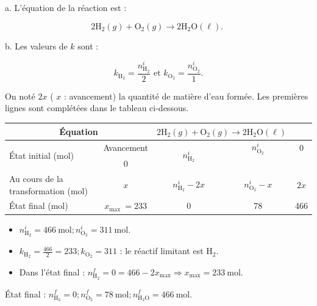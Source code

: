 a. L'équation de la réaction est :

$$
2 \mathrm{H}_{2}(g)+\mathrm{O}_{2}(g) \longrightarrow 2 \mathrm{H}_{2} \mathrm{O}(\ell) \text {. }
$$

b. Les valeurs de $k$ sont :

$$
k_{\mathrm{H}_{2}}=\frac{n_{\mathrm{H}_{2}}^{i}}{2} \text { et } k_{\mathrm{O}_{2}}=\frac{n_{\mathrm{O}_{2}}^{i}}{1} .
$$

On noté $2 x$ ( $x$ : avancement) la quantité de matière d'eau formée. Les premières lignes sont complétées dans le tableau ci-dessous.

\begin{center}
\begin{tabular}{l|c|c|c|c}
\hline
\multicolumn{2}{c|}{Équation} & \multicolumn{2}{c}{$2 \mathrm{H}_{2}(g)+\mathrm{O}_{2}(g) \longrightarrow 2 \mathrm{H}_{2} \mathrm{O}(\ell)$} &  \\
\hline
\multirow{2}{*}{État initial (mol)} & Avancement & \multirow{2}{*}{$n_{\mathrm{H}_{2}}^{i}$} & $n_{\mathrm{O}_{2}}^{i}$ & 0 \\
\cline { 2 - 2 }
 & 0 &  &  &  \\
\hline
Au cours de la transformation (mol) & $x$ & $n_{\mathrm{H}_{2}}^{i}-2 x$ & $n_{\mathrm{O}_{2}}^{i}-x$ & $2 x$ \\
\hline
État final (mol) & $x_{\text {max }}=233$ & 0 & 78 & 466 \\
\hline
\end{tabular}
\end{center}

\begin{itemize}
  \item $n_{\mathrm{H}_{2}}^{i}=466 \mathrm{~mol} ; n_{\mathrm{O}_{2}}^{i}=311 \mathrm{~mol}$.
  \item $k_{\mathrm{H}_{2}}=\frac{466}{2}=233 ; k_{\mathrm{O}_{2}}=311$ : le réactif limitant est $\mathrm{H}_{2}$.
  \item Dans l'état final : $n_{\mathrm{H}_{2}}^{f}=0=466-2 x_{\max } \Rightarrow x_{\max }=233 \mathrm{~mol}$.
\end{itemize}

État final : $n_{\mathrm{H}_{2}}^{f}=0 ; n_{\mathrm{O}_{2}}^{f}=78 \mathrm{~mol} ; n_{\mathrm{H}_{2} \mathrm{O}}^{f}=466 \mathrm{~mol}$.


